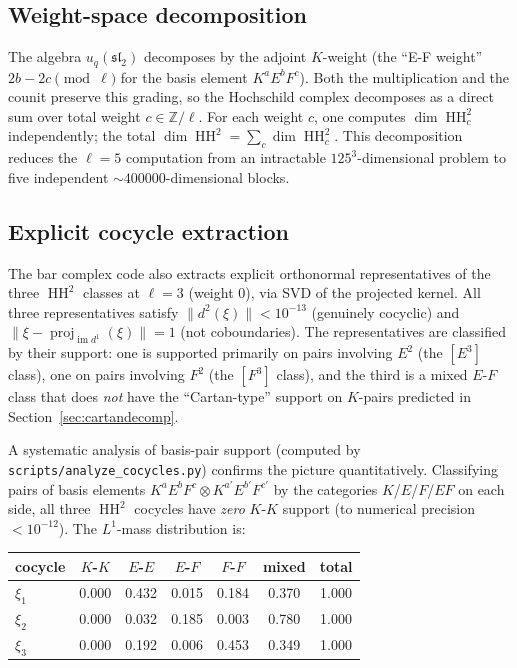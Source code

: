 \documentclass[11pt,letterpaper]{amsart}
\theoremstyle{plain}
\theoremstyle{definition}
\theoremstyle{remark}
\newcommand{\HH}{\operatorname{HH}}
\newcommand{\ZZ}{\mathbb{Z}}
\begin{document}
\subsection{Weight-space decomposition}
\label{sec:weightspace}
The algebra $u_q(\mathfrak{sl}_2)$ decomposes by the adjoint $K$-weight (the ``E-F weight'' $2b - 2c \pmod{\ell}$ for the basis element $K^a E^b F^c$). Both the multiplication and the counit preserve this grading, so the Hochschild complex decomposes as a direct sum over total weight $c \in \ZZ/\ell$. For each weight $c$, one computes $\dim \HH^2_c$ independently; the total $\dim \HH^2 = \sum_c \dim \HH^2_c$. This decomposition reduces the $\ell = 5$ computation from an intractable $125^3$-dimensional problem to five independent $\sim 400000$-dimensional blocks.

\subsection{Explicit cocycle extraction}
\label{sec:cocycles}
The bar complex code also extracts explicit orthonormal representatives of the three $\HH^2$ classes at $\ell = 3$ (weight $0$), via SVD of the projected kernel. All three representatives satisfy $\|d^2(\xi)\| < 10^{-13}$ (genuinely cocyclic) and $\|\xi - \operatorname{proj}_{\operatorname{im} d^1}(\xi)\| = 1$ (not coboundaries). The representatives are classified by their support: one is supported primarily on pairs involving $E^2$ (the $[E^3]$ class), one on pairs involving $F^2$ (the $[F^3]$ class), and the third is a mixed $E$-$F$ class that does \emph{not} have the ``Cartan-type'' support on $K$-pairs predicted in Section~\ref{sec:cartandecomp}.

A systematic analysis of basis-pair support (computed by \texttt{scripts/analyze\_cocycles.py}) confirms the picture quantitatively. Classifying pairs of basis elements $K^a E^b F^c \otimes K^{a'} E^{b'} F^{c'}$ by the categories $K$/$E$/$F$/$EF$ on each side, all three $\HH^2$ cocycles have \emph{zero} $K$-$K$ support (to numerical precision $< 10^{-12}$). The $L^1$-mass distribution is:

\begin{center}
\begin{tabular}{lcccccc}
\toprule
cocycle & $K$-$K$ & $E$-$E$ & $E$-$F$ & $F$-$F$ & mixed & total \\
\midrule
$\xi_1$ & 0.000 & 0.432 & 0.015 & 0.184 & 0.370 & 1.000 \\
$\xi_2$ & 0.000 & 0.032 & 0.185 & 0.003 & 0.780 & 1.000 \\
$\xi_3$ & 0.000 & 0.192 & 0.006 & 0.453 & 0.349 & 1.000 \\
\bottomrule
\end{tabular}
\end{center}
\end{document}
